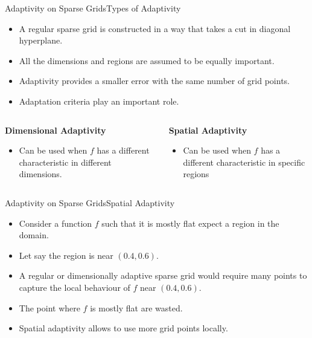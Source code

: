 \begin{frame}{Adaptivity on Sparse Grids}{Types of Adaptivity}

    \begin{itemize}[<+->]
        \item A regular sparse grid is constructed in a way that takes a cut in diagonal hyperplane.
        \item All the dimensions and regions are assumed to be equally important.
        \item Adaptivity provides a smaller error with the same number of grid points.
        \item Adaptation criteria play an important role.
    \end{itemize}

    \begin{columns}
        \pause
        \begin{column}{0.5\textwidth}
            \begin{center}
                \textbf{Dimensional Adaptivity}
            \end{center}
            \begin{itemize}[<+->]
                \item Can be used when \(f\) has a different characteristic in different dimensions.
            \end{itemize}
        \end{column}
        \pause
        \begin{column}{0.5\textwidth}
            \begin{center}
                \textbf{Spatial Adaptivity}
            \end{center}
            \begin{itemize}[<+->]
                \item Can be used when \(f\) has a different characteristic in specific regions
            \end{itemize}
        \end{column}
    \end{columns}

\end{frame}

\begin{frame}{Adaptivity on Sparse Grids}{Spatial Adaptivity}
    \begin{itemize}[<+->]
        \item[]    Consider a function \(f\) such that it is mostly flat expect a region in the domain.
        \item[] Let say the region is near \( (0.4,0.6) \).
        \item[] A regular or dimensionally adaptive sparse grid would require many points to capture the local behaviour of \(f\) near \( (0.4,0.6) \).
        \item[] The point where \(f\) is mostly flat are wasted.
        \item[] Spatial adaptivity allows to use more grid points locally.
    \end{itemize}

\end{frame}

